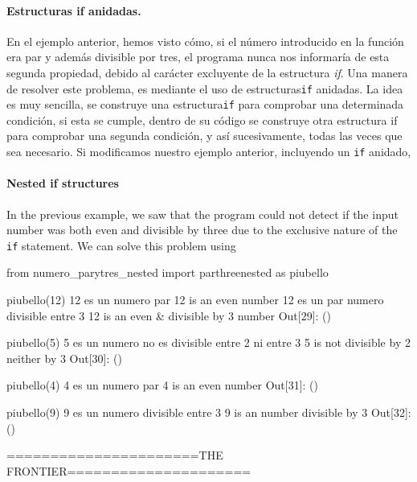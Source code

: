 \begin{paracol}{2}
\paragraph{Estructuras if anidadas.} 
En el ejemplo anterior, hemos visto cómo, si el número introducido en la función era par y además divisible por tres, el programa nunca nos informaría de esta segunda propiedad, debido al carácter excluyente de la estructura \emph{if}. Una manera de resolver este problema, es mediante el uso de estructuras\texttt{if} anidadas. La idea es muy sencilla, se construye una estructura\texttt{if} para comprobar una determinada condición, si esta se cumple, dentro de su código se construye otra estructura if para comprobar una segunda condición, y así sucesivamente, todas las veces que sea necesario. Si modificamos nuestro ejemplo anterior, incluyendo un \texttt{if} anidado,
\switchcolumn
\paragraph{Nested if structures}
In the previous example, we saw that the program could not detect if the input number was both even and divisible by three due to the exclusive nature of the \texttt{if} statement. We can solve this problem using 
   
\end{paracol}
\begin{center}
    \begin{minipage}{.5\textwidth}
    
from numero_parytres_nested import parthreenested as piubello

piubello(12)
12  es un numero par
12 is an even number
12  es un par numero divisible entre 3
12 is an even & divisible by 3 number
Out[29]: ()

piubello(5)
5  es un numero no es divisible entre 2 ni entre 3
5 is not divisible by 2 neither by 3 
Out[30]: ()

piubello(4)
4  es un numero par
4 is an even number
Out[31]: ()

piubello(9)
9  es un numero divisible entre 3
9 is an number divisible by 3
Out[32]: ()
\end{minipage}
\end{center}
======================THE FRONTIER=====================



